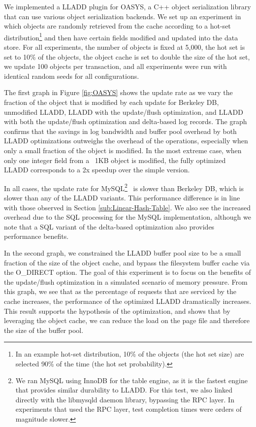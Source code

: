 \documentclass[10pt,letterpaper,twocolumn,english]{article}
\newcommand{\yad}{LLADD\xspace}
\newcommand{\oasys}{OASYS\xspace}
\begin{document}
We implemented a \yad plugin for \oasys, a C++ object serialization
library that can use various object serialization backends. 
We set up an experiment in which objects are randomly
retrieved from the cache according to a hot-set distribution\footnote{In
an example hot-set distribution, 10\% of the objects (the hot set size) are
selected 90\% of the time (the hot set probability).} 
and then have certain fields modified and
updated into the data store. For all experiments, the number of objects
is fixed at 5,000, the
hot set is set to 10\% of the objects, the object cache is set to
double the size of the hot set, we update 100 objects per
transaction, and all experiments were run with identical random seeds 
for all configurations.

The first graph in Figure \ref{fig:OASYS} shows the update rate as we
vary the fraction of the object that is modified by each update for
Berkeley DB, unmodified \yad, \yad with the update/flush optimization,
and \yad with both the update/flush optimization and delta-based log
records.
The graph confirms that the savings in log bandwidth and
buffer pool overhead by both \yad optimizations 
outweighs the overhead of the operations, especially when only a small
fraction of the object is modified.
In the most extreme case, when
only one integer field from a ~1KB object is modified, the fully
optimized \yad corresponds to a 2x speedup over the simple version.

In all cases, the update rate for MySQL\footnote{We ran MySQL using
InnoDB for the table engine, as it is the fastest engine that provides
similar durability to \yad. For this test, we also linked directly
with the libmysqld daemon library, bypassing the RPC layer. In
experiments that used the RPC layer, test completion times were orders
of magnitude slower.}~\cite{mysql} is slower than Berkeley DB,
which is slower than any of the \yad variants. This performance
difference is in line with those observed in Section
\ref{sub:Linear-Hash-Table}. We also see the increased overhead due to
the SQL processing for the MySQL implementation, although we note that
a SQL variant of the delta-based optimization also provides performance
benefits.

In the second graph, we constrained the \yad buffer pool size to be a
small fraction of the size of the object cache, and bypass the filesystem
buffer cache via the O\_DIRECT option. The goal of this experiment is to
focus on the benefits of the update/flush optimization in a simulated
scenario of memory pressure. From this graph, we see that as the percentage of
requests that are serviced by the cache increases, the
performance of the optimized \yad dramatically increases.
This result supports the hypothesis of the optimization, and
shows that by leveraging the object cache, we can reduce the load on
the page file and therefore the size of the buffer pool.
\end{document}
